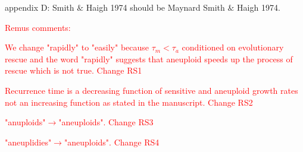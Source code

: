 \documentclass[12pt]{extarticle}
\begin{document}
appendix D: Smith $\&$ Haigh 1974 should be Maynard Smith $\&$ Haigh 1974.

\textcolor{red}{Remus comments:}

\textcolor{red}{We change "rapidly" to "easily" because $\tau_m<\tau_a$ conditioned on evolutionary rescue and the word "rapidly" suggests that aneuploid speeds up the process of rescue which is not true. Change RS1}

\textcolor{red}{Recurrence time is a decreasing function of sensitive and aneuploid growth rates not an increasing function as stated in the manuscript. Change RS2}

\textcolor{red}{"anuploids"$\rightarrow$"aneuploids". Change RS3}

\textcolor{red}{"aneuplidies"$\rightarrow$"aneuploids". Change RS4}








\end{document}
